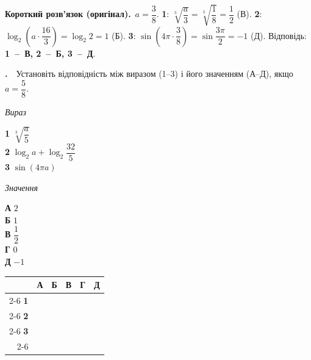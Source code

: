 \documentclass[12pt]{article}
\newcommand{\matchingGrid}{%
    \begingroup
    \renewcommand{\arraystretch}{1.15}
    \setlength{\tabcolsep}{4pt}
    \footnotesize
    \begin{tabular}{r|c|c|c|c|c|}
         \multicolumn{1}{c}{} & \multicolumn{1}{c}{\textbf{А}} & \multicolumn{1}{c}{\textbf{Б}} & \multicolumn{1}{c}{\textbf{В}} & \multicolumn{1}{c}{\textbf{Г}} & \multicolumn{1}{c}{\textbf{Д}} \\ \cline{2-6}
         \textbf{1} & \phantom{X} & \phantom{X} & \phantom{X} & \phantom{X} & \phantom{X} \\ \cline{2-6}
         \textbf{2} & & & & & \\ \cline{2-6}
         \textbf{3} & & & & & \\ \cline{2-6}
    \end{tabular}
    \endgroup
}
\newcounter{zad}
\newcommand{\zadtask}[1]{\stepcounter{zad}\noindent\textbf{\thezad.}\ \ #1\par\vspace{0.2cm}}
\newcommand{\solution}[1]{%
\par\vspace{0.12cm}
\begin{tcolorbox}[colback=titleBg!45, colframe=mainGreen!55, boxrule=0.4pt, arc=2pt,
    left=6pt, right=6pt, top=3pt, bottom=3pt, breakable]
\footnotesize\textbf{Короткий розв'язок (оригінал).}\ #1
\end{tcolorbox}
\par\vspace{0.12cm}
}
\begin{document}
\solution{$a=\dfrac38$. \textbf{1}: $\sqrt[3]{\dfrac{a}{3}}=\sqrt[3]{\dfrac18}=\dfrac12$ (В). \textbf{2}: $\log_2\!\left(a\cdot\dfrac{16}{3}\right)=\log_2 2=1$ (Б). \textbf{3}: $\sin\!\left(4\pi\cdot\dfrac38\right)=\sin\dfrac{3\pi}{2}=-1$ (Д). Відповідь: \textbf{1~--~В, 2~--~Б, 3~--~Д}.}
\zadtask{Установіть відповідність між виразом (1--3) і його значенням (А--Д), якщо $a = \dfrac{5}{8}$.

\vspace{0.2cm}
\noindent
\begin{minipage}[t]{0.45\textwidth}
\textit{Вираз}\par\vspace{0.15cm}
\textbf{1} \quad $\sqrt[3]{\dfrac{a}{5}}$\\[0.35cm]
\textbf{2} \quad $\log_2 a + \log_2 \dfrac{32}{5}$\\[0.35cm]
\textbf{3} \quad $\sin(4\pi a)$
\end{minipage}
\hfill
\begin{minipage}[t]{0.3\textwidth}
\textit{Значення}\par\vspace{0.15cm}
\textbf{А} \quad $2$\\[0.15cm]
\textbf{Б} \quad $1$\\[0.15cm]
\textbf{В} \quad $\dfrac{1}{2}$\\[0.2cm]
\textbf{Г} \quad $0$\\[0.15cm]
\textbf{Д} \quad $-1$
\end{minipage}
\hfill
\begin{minipage}[t]{0.2\textwidth}
\vspace{0.4cm}
\begin{flushright}\matchingGrid\end{flushright}
\end{minipage}
}
\end{document}
